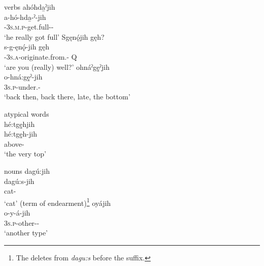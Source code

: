 \ea\label{ex:jihex} verbs
\ea ahóhda̱ˀjih\\
\gll a-hó-hda̱-ˀ-jih\\
 {\factual}-\textsc{3s.m.p}-get.full-{\punctual}-{\intensifier}\\
\glt `he really got full'
\ex Sgęnǫ́jih gęh?\\
\gll s-g-ęnǫ́-jih gęh\\
 {\repetitive}-\textsc{3s.a}-originate.from.{\stative}-{\intensifier} Q\\
\glt `are you (really) well?'
\ex ohnáˀgę̱ˀjih\\
\gll o-hná:gę̱ˀ-jih\\
 \textsc{3s.p}-under.{\stative}-{\intensifier}\\
\glt `back then, back there, late, the bottom'
\z
\z

\ea\label{ex:jihex2} atypical words\\
hé:tgę̱hjih\\
\gll hé:tgę̱h-jih\\
 above-{\intensifier}\\
\glt `the very top'
\z


\ea\label{ex:jihex3} nouns
\ea dagú:jih\\\label{ex:jihex3a}
\gll dagú:s-jih\\
cat-\textsc{\intensifier}\\
\glt ‘cat’ (term of endearment)\footnote{The  deletes from \textit{dagu:s} before the  {\intensifier} suffix.} 
\ex oyájih\\\label{ex:jihex3b}
\gll o-y-á-jih\\
\textsc{3s.p}-other-{\joinerA}-\textsc{\intensifier}\\
\glt ‘another type’
\z
\z

